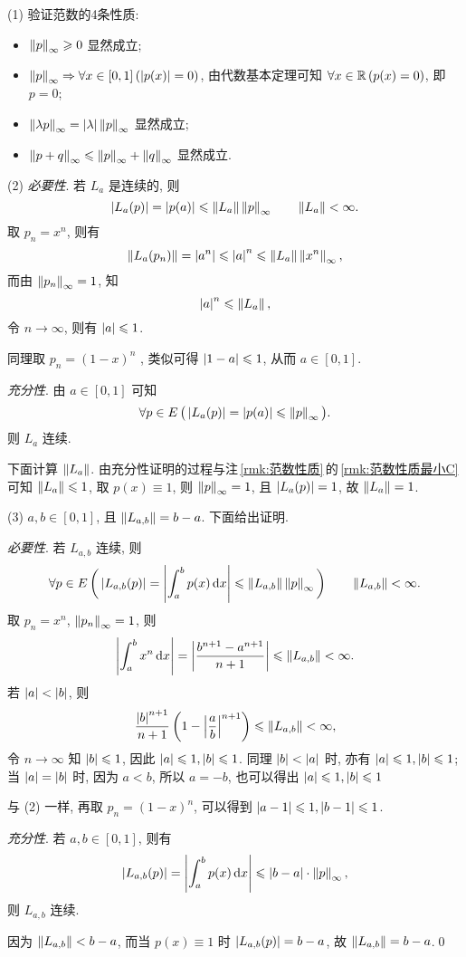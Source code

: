 	\begin{Proof}
		(1) 验证范数的4条性质:
		\begin{itemize}
			\item $ \left\| p \right\|_{\infty}\geqslant 0 $ 显然成立;
			\item $ \left\| p \right\|_{\infty}\Rightarrow \forall x\in [0, 1]\,(\left| p(x) \right| =0) $, 由代数基本定理可知 $ \forall x\in\mathbb{R}\,(p(x)=0) $, 即 $ p=0 $;
			\item $ \left\| \lambda p \right\|_{\infty}=\left| \lambda \right| \left\| p \right\|_{\infty} $ 显然成立;
			\item $ \left\| p+q \right\|_{\infty}\leqslant\left\| p \right\|_{\infty}+\left\| q \right\|_{\infty} $ 显然成立.
		\end{itemize}

		(2) \textsl{必要性}. 若 $ L_{a} $ 是连续的, 则
		\[
			\left| L_{a}(p) \right| =\left| p(a) \right| \leqslant \left\| L_{a} \right\|\left\| p \right\|_{\infty}\qquad\left\| L_{a} \right\|<\infty.
		\]
		取 $ p_{n}=x^{n} $, 则有
		\[
			\left\| L_{a}(p_{n}) \right\|=\left| a^{n} \right| \leqslant\left| a \right| ^{n}\leqslant \left\| L_{a} \right\|\left\| x^{n} \right\|_{\infty},
		\]
		而由 $ \left\| p_{n} \right\|_{\infty}=1 $, 知
		\[
			\left| a \right| ^{n}\leqslant\left\| L_{a} \right\|,
		\]
		令 $ n\to\infty $, 则有 $ \left| a \right| \leqslant1 $. 

		同理取 $ p_{n}=(1-x)^{n} $ , 类似可得 $ \left| 1-a \right| \leqslant1 $, 从而 $ a\in[0, 1] $.

		\textsl{充分性}. 由 $ a\in[0, 1] $ 可知
		\[
			\forall p\in E\,\big(\left| L_{a}(p) \right| =\left| p(a) \right| \leqslant\left\| p \right\|_{\infty}\big).
		\]
		则 $ L_{a} $ 连续.

		下面计算 $ \left\| L_{a} \right\| $. 由充分性证明的过程与注\,\ref{rmk:范数性质}\,的\,\ref{rmk:范数性质最小C}\,可知 $ \left\| L_{a} \right\|\leqslant1 $, 取 $ p(x)\equiv 1 $, 则 $ \left\| p \right\|_{\infty}=1 $, 且 $ \left| L_{a}(p) \right| =1 $, 故 $ \left\| L_{a} \right\|=1 $.

		(3) $ a, b\in[0, 1] $, 且 $ \left\| L_{a, b} \right\|=b-a $. 下面给出证明.

		\textsl{必要性}. 若 $ L_{a, b} $ 连续, 则
		\[
			\forall p\in E\,\bigg(\left| L_{a, b}(p) \right| =\left| \int_{a}^{b}p(x)\,\mathrm{d} x \right| \leqslant \left\| L_{a, b} \right\|\left\| p \right\|_{\infty}\bigg)\qquad \left\| L_{a, b} \right\|<\infty.
		\]
		取 $ p_{n}=x^{n} $, $ \left\| p_{n} \right\|_{\infty}=1 $, 则
		\[
			\left| \int_{a}^{b}x^{n}\,\mathrm{d} x \right| =\left| \frac{b^{n+1}-a^{n+1}}{n+1} \right| \leqslant\left\| L_{a, b} \right\|<\infty.
		\]
		若 $ \left| a \right| <\left| b \right|  $, 则
		\[
			\frac{\left| b \right| ^{n+1}}{n+1}\left( 1-\left| \frac{a}{b} \right| ^{n+1} \right) \leqslant \left\| L_{a, b} \right\|<\infty,
		\]
		令 $ n\to\infty $ 知 $ \left| b \right| \leqslant1 $, 因此 $ \left| a \right| \leqslant1, \left| b \right| \leqslant1 $. 同理 $ \left| b \right| <\left| a \right|  $ 时, 亦有 $ \left| a \right| \leqslant1, \left| b \right| \leqslant1 $; 当 $ \left| a \right| =\left| b \right|  $ 时, 因为 $ a<b $, 所以 $ a=-b $, 也可以得出 $ \left| a \right| \leqslant1, \left| b \right| \leqslant1 $

		与 (2) 一样, 再取 $ p_{n}=(1-x)^{n} $, 可以得到 $ \left| a-1 \right| \leqslant1, \left| b-1 \right| \leqslant1 $.

		\textsl{充分性}. 若 $ a, b\in[0, 1] $, 则有
		\[
			\left| L_{a, b}(p) \right| =\left| \int_{a}^{b}p(x)\,\mathrm{d} x \right| \leqslant \left| b-a \right| \cdot \left\| p \right\|_{\infty},
		\]
		则 $ L_{a, b} $ 连续. 

		因为 $ \left\| L_{a, b} \right\|<b-a $, 而当 $ p(x)\equiv 1 $ 时 $ \left| L_{a, b}(p) \right| =b-a $, 故 $ \left\| L_{a, b} \right\|=b-a $.\qed
	\end{Proof}

